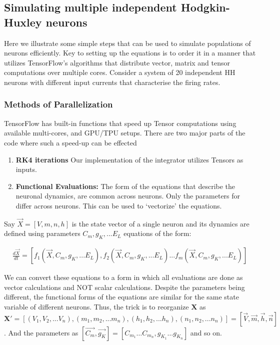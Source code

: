 \documentclass[10pt,letterpaper]{article}
\begin{document}
\begin{nolinenumbers}
\subsection*{Simulating multiple independent Hodgkin-Huxley neurons}

Here we illustrate some simple steps that can be used to simulate populations of neurons efficiently. Key to setting up the equations is to order it in a manner that utilizes TensorFlow's algorithms that distribute vector, matrix and tensor computations over multiple cores. Consider a system of 20 independent HH neurons with different input currents that characterise the firing rates. 

\subsubsection*{Methods of Parallelization}
TensorFlow has built-in functions that speed up Tensor computations using available multi-cores, and GPU/TPU setups. There are two major parts of the code where such a speed-up can be effected
\begin{enumerate}
\item \textbf{RK4 iterations} Our implementation of the integrator utilizes Tensors as inputs. 
\item \textbf{Functional Evaluations:} The form of the equations that describe the neuronal dynamics,  are common across neurons. Only the parameters for differ across neurons. This can be used to `vectorize' the equations.
\end{enumerate}

Say $\vec{X}=[V,m,n,h]$ is the state vector of a single neuron and its dynamics are defined using parameters $C_m,g_K,...E_L$ equations of the form: 

\begin{eqnarray}\frac{d\vec{X}}{dt} = [f_1(\vec{X},C_m,g_K,...E_L),f_2(\vec{X},C_m,g_K,...E_L)...f_m(\vec{X},C_m,g_K,...E_L)]\end{eqnarray}

We can convert these equations to a form in which all evaluations are done as vector calculations and NOT scalar calculations. Despite the parameters being different, the functional forms of the equations are similar for the same state variable of different neurons. Thus, the trick is to reorganize $\mathbf{X}$ as $\mathbf{X'}=[(V_1,V_2,...V_n),(m_1,m_2,...m_n),(h_1,h_2,...h_n),(n_1,n_2,...n_n)]=[\vec{V},\vec{m},\vec{h},\vec{n}]$. And the parameters as $[\vec{C_m},\vec{g_K}] = [C_{m_{1}}\dots C_{m_{n}},g_{K_{1}}\dots g_{K_{n}}]$ and so on.


\end{nolinenumbers}
\end{document}
